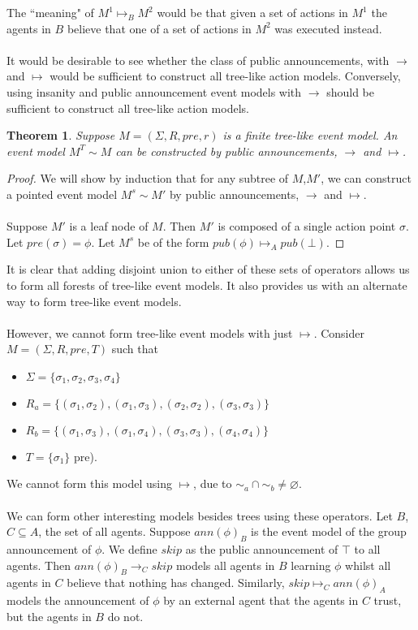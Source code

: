 \documentclass[12pt, a4paper, titlepage]{scrartcl}
\newtheorem{thm}{Theorem}
\begin{document}
The ``meaning" of $M^1 \mapsto_B M^2$ would be that given a set of actions in
$M^1$ the agents in $B$ believe that one of a set of actions in $M^2$ was
executed instead.\\
\\
It would be desirable to see whether the class of public announcements, with
$\to$ and $\mapsto$ would be sufficient to construct all tree-like action
models.
Conversely, using insanity and public announcement event models with $\to$ should be sufficient to construct
all tree-like action models.
\begin{thm}
Suppose $M = (\Sigma, R, pre, r)$ is a finite tree-like event model.
An event model $M^T \sim M$ can be constructed by public announcements, $\to$ and
$\mapsto$.
\end{thm}
\begin{proof}
We will show by induction that for any subtree of $M$,$M'$, we can construct a pointed event model
$M^s \sim M'$ by public announcements, $\to$ and $\mapsto$.\\
\\
Suppose $M'$ is a leaf node of $M$.
Then $M'$ is composed of a single action point $\sigma$.
Let $pre(\sigma) = \phi$.
Let $M^s$ be of the form $pub(\phi) \mapsto_A pub(\bot)$.
\end{proof}
It is clear that adding disjoint union to either of these sets of operators
allows us to form all forests of tree-like event models.
It also provides us with an alternate way to form tree-like event models.\\
\\
However, we cannot form tree-like event models with just $\mapsto$.
Consider $M = (\Sigma, R, pre, T)$ such that
\begin{itemize}
	\item $\Sigma = \{\sigma_1, \sigma_2, \sigma_3, \sigma_4\}$
	\item $R_a =
\{(\sigma_1,\sigma_2),(\sigma_1,\sigma_3),(\sigma_2,\sigma_2),(\sigma_3,\sigma_3)\}$
	\item $R_b = \{(\sigma_1,\sigma_3),(\sigma_1,\sigma_4),(\sigma_3,\sigma_3),(\sigma_4,\sigma_4)\}$
	\item $T = \{ \sigma_1 \}$
pre).
\end{itemize}
We cannot form this model using $ \mapsto $, due to $\sim_a \cap \sim_b \neq
\varnothing$.\\
\\
We can form other interesting models besides trees using these operators.
Let $B$, $C \subseteq A$, the set of all agents.
Suppose $ann(\phi)_B$ is the event model of the group announcement of $\phi$.
We define $skip$ as the public announcement of $\top$ to all agents.
Then $ann(\phi)_B \to_C skip$ models all agents in $B$ learning $\phi$ whilst all agents in $C$
believe that nothing has changed.
Similarly, $skip \mapsto_C ann(\phi)_A$ models the announcement of $\phi$ by an external agent that
the agents in $C$ trust, but the agents in $B$ do not.\\
\\
\end{document}
